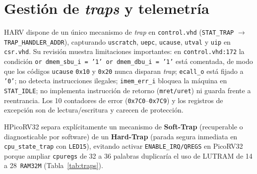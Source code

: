 \documentclass[a4paper,10pt]{article}
\begin{document}
\section{Gestión de \textit{traps} y telemetría}

HARV dispone de un único mecanismo de \textit{trap} en \texttt{control.vhd} (\texttt{STAT\_TRAP} $\rightarrow$ \texttt{TRAP\_HANDLER\_ADDR}), capturando \texttt{uscratch}, \texttt{uepc}, \texttt{ucause}, \texttt{utval} y \texttt{uip} en \texttt{csr.vhd}. Su revisión muestra limitaciones importantes: en \texttt{control.vhd:172} la condición \texttt{or dmem\_sbu\_i = '1' or dmem\_dbu\_i = '1'} está comentada, de modo que los códigos \texttt{ucause} \texttt{0x10} y \texttt{0x20} nunca disparan \textit{trap}; \texttt{ecall\_o} está fijado a \texttt{'0'}; no detecta instrucciones ilegales; \texttt{imem\_err\_i} bloquea la máquina en \texttt{STAT\_IDLE}; no implementa instrucción de retorno (\texttt{mret/uret}) ni guarda frente a reentrancia. Los 10 contadores de error (\texttt{0x7C0}--\texttt{0x7C9}) y los registros de excepción son de lectura/escritura y carecen de protección.

HPicoRV32 separa explícitamente un mecanismo de \textbf{Soft-Trap} (recuperable o diagnosticable por software) de un \textbf{Hard-Trap} (parada segura inmediata en \texttt{cpu\_state\_trap} con \texttt{LED15}), evitando activar \texttt{ENABLE\_IRQ/QREGS} en PicoRV32 porque ampliar \texttt{cpuregs} de 32 a 36 palabras duplicaría el uso de LUTRAM de 14 a 28~\texttt{RAM32M} (Tabla~\ref{tab:traps}).
\end{document}
